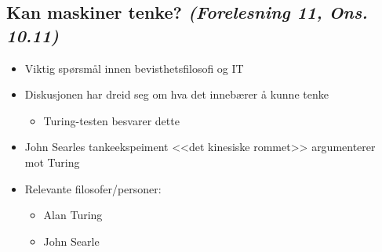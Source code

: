 \subsection*{Kan maskiner tenke? \textnormal{\textit{(Forelesning 11, Ons. 10.11)}}}
\begin{itemize}
    \item Viktig spørsmål innen bevisthetsfilosofi og IT
    \item Diskusjonen har dreid seg om hva det innebærer å kunne tenke
          \begin{itemize}
              \item Turing-testen besvarer dette
          \end{itemize}
    \item John Searles tankeekspeiment <<det kinesiske rommet>> argumenterer \\mot Turing
    \item Relevante filosofer/personer:
          \begin{itemize}
              \item Alan Turing
              \item John Searle
          \end{itemize}
\end{itemize}
\newpage